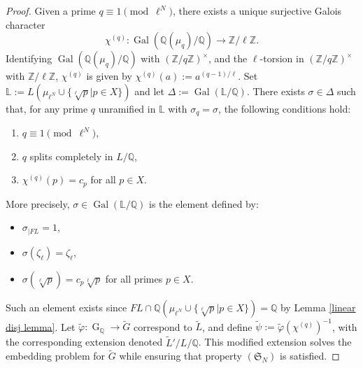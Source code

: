 \documentclass[11pt,reqno]{amsart}
\newcommand{\Z}{\mathbb{Z}}
\newcommand{\Q}{\mathbb{Q}}
\newcommand{\op}[1]{\operatorname{#1}}
\numberwithin{equation}{section}
\begin{document}
\begin{proof}
  Given a prime $q\equiv 1\pmod{\ell^N}$, there exists a unique surjective Galois character \[\chi^{(q)}:\op{Gal}(\Q(\mu_q)/\Q)\rightarrow \Z/\ell\Z.\] Identifying $\op{Gal}(\Q(\mu_q)/\Q)$ with $(\Z/q\Z)^\times$, and the $\ell$-torsion in $(\Z/q\Z)^\times$ with $\Z/\ell\Z$, $\chi^{(q)}$ is given by $\chi^{(q)}(a):=a^{(q-1)/\ell}$. Set \(\mathbb{L} := L\left(\mu_{\ell^N}\cup \{\sqrt[\ell]{p}| p
\in X\}\right)\) and let \(\Delta := \operatorname{Gal}(\mathbb{L}/\mathbb{Q})\). There exists \(\sigma\in \Delta\) such that, for any prime \(q\) unramified in \(\mathbb{L}\) with \(\sigma_q =\sigma\), the following conditions hold:

\begin{enumerate}
    \item \(q \equiv 1 \pmod{\ell^N}\),
    \item \(q\) splits completely in \(L/\mathbb{Q}\),
    \item \(\chi^{(q)}(p) = c_{p}\) for all $p\in X$.
\end{enumerate}
More precisely, $\sigma\in \op{Gal}(\mathbb{L}/\Q)$ is the element defined by:
\begin{itemize}
    \item $\sigma_{|FL}=1$, 
    \item $\sigma(\zeta_\ell)=\zeta_\ell$, 
    \item $\sigma(\sqrt[\ell]{p})=c_p \sqrt[\ell]{p}$ for all primes $p\in X$.
\end{itemize}
Such an element exists since $FL\cap \Q\left(\mu_{\ell^N}\cup \{\sqrt[\ell]{p}| p
\in X\}\right)=\Q$ by Lemma \ref{linear disj lemma}. Let \(\widetilde{\varphi} : \operatorname{G}_{\mathbb{Q}} \to \widetilde{G}\) correspond to \(\widetilde{L}\), and define \(\widetilde{\psi} := \widetilde{\varphi} (\chi^{(q)})^{-1}\), with the corresponding extension denoted \(\widetilde{L}'/L/\mathbb{Q}\). This modified extension solves the embedding problem for \(\widetilde{G}\) while ensuring that property \((\mathfrak{S}_N)\) is satisfied.

\end{proof}

 
\end{document}
